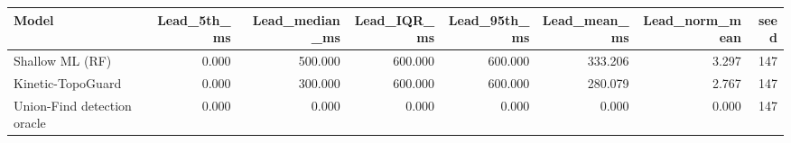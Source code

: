 \begin{tabular}{lrrrrrrr}
\toprule
Model & Lead\_5th\_ms & Lead\_median\_ms & Lead\_IQR\_ms & Lead\_95th\_ms & Lead\_mean\_ms & Lead\_norm\_mean & seed \\
\midrule
Shallow ML (RF) & 0.000 & 500.000 & 600.000 & 600.000 & 333.206 & 3.297 & 147 \\
Kinetic-TopoGuard & 0.000 & 300.000 & 600.000 & 600.000 & 280.079 & 2.767 & 147 \\
Union-Find detection oracle & 0.000 & 0.000 & 0.000 & 0.000 & 0.000 & 0.000 & 147 \\
\bottomrule
\end{tabular}